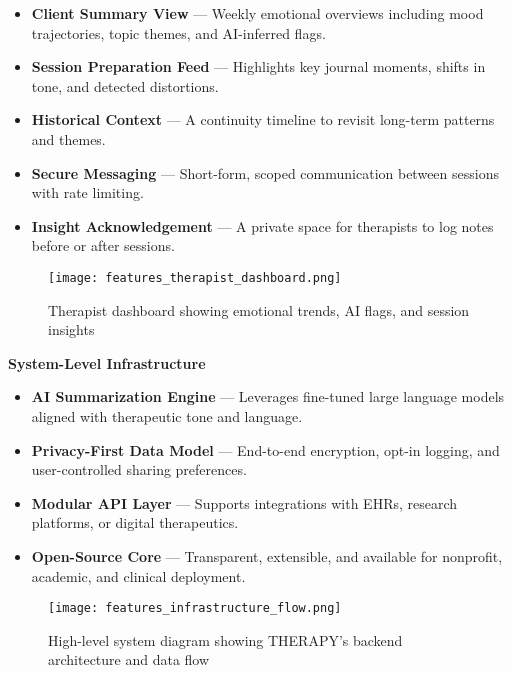\begin{itemize}
  \item \textbf{Client Summary View} — Weekly emotional overviews including mood trajectories, topic themes, and AI-inferred flags.
  \item \textbf{Session Preparation Feed} — Highlights key journal moments, shifts in tone, and detected distortions.
  \item \textbf{Historical Context} — A continuity timeline to revisit long-term patterns and themes.
  \item \textbf{Secure Messaging} — Short-form, scoped communication between sessions with rate limiting.
  \item \textbf{Insight Acknowledgement} — A private space for therapists to log notes before or after sessions.
\end{itemize}

\begin{figure}[H]
  \centering
  \texttt{[image: features\_therapist\_dashboard.png]}
  \caption{Therapist dashboard showing emotional trends, AI flags, and session insights}
\end{figure}

\bigskip

\noindent\textbf{System-Level Infrastructure}

\begin{itemize}
  \item \textbf{AI Summarization Engine} — Leverages fine-tuned large language models aligned with therapeutic tone and language.
  \item \textbf{Privacy-First Data Model} — End-to-end encryption, opt-in logging, and user-controlled sharing preferences.
  \item \textbf{Modular API Layer} — Supports integrations with EHRs, research platforms, or digital therapeutics.
  \item \textbf{Open-Source Core} — Transparent, extensible, and available for nonprofit, academic, and clinical deployment.
\end{itemize}

\begin{figure}[H]
  \centering
  \texttt{[image: features\_infrastructure\_flow.png]}
  \caption{High-level system diagram showing THERAPY's backend architecture and data flow}
\end{figure}
